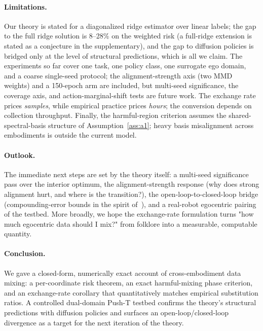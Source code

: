 \paragraph{Limitations.}
Our theory is stated for a diagonalized ridge estimator over linear labels; the gap to the full ridge solution is 8--28\% on the weighted risk (a full-ridge extension is stated as a conjecture in the supplementary), and the gap to diffusion policies is bridged only at the level of structural predictions, which is all we claim.
The experiments so far cover one task, one policy class, one surrogate ego domain, and a coarse single-seed protocol; the alignment-strength axis (two MMD weights) and a 150-epoch arm are included, but multi-seed significance, the coverage axis, and action-marginal-shift tests are future work.
The exchange rate prices \emph{samples}, while empirical practice prices \emph{hours}; the conversion depends on collection throughput.
Finally, the harmful-region criterion assumes the shared-spectral-basis structure of Assumption~\ref{ass:a1}; heavy basis misalignment across embodiments is outside the current model.

\paragraph{Outlook.}
The immediate next steps are set by the theory itself: a multi-seed significance pass over the interior optimum, the alignment-strength response (why does strong alignment hurt, and where is the transition?), the open-loop-to-closed-loop bridge (compounding-error bounds in the spirit of~\cite{ross2011reduction}), and a real-robot egocentric pairing of the testbed.
More broadly, we hope the exchange-rate formulation turns "how much egocentric data should I mix?" from folklore into a measurable, computable quantity.

\paragraph{Conclusion.}
We gave a closed-form, numerically exact account of cross-embodiment data mixing: a per-coordinate risk theorem, an exact harmful-mixing phase criterion, and an exchange-rate corollary that quantitatively matches empirical substitution ratios.
A controlled dual-domain Push-T testbed confirms the theory's structural predictions with diffusion policies and surfaces an open-loop/closed-loop divergence as a target for the next iteration of the theory.
